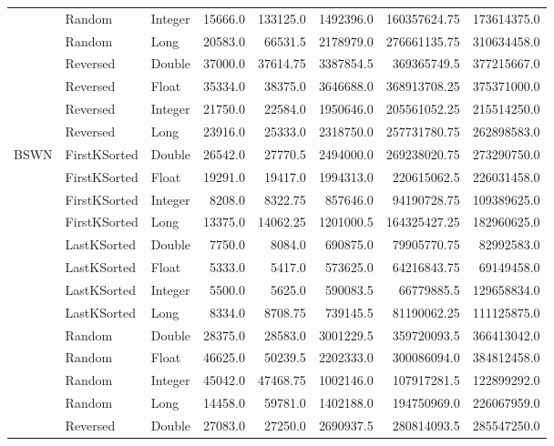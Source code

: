 \documentclass[unicode,11pt,a4paper,oneside,numbers=endperiod,openany]{scrartcl}
\begin{document}
\begin{center}
\begin{longtable}{|l|l|l|r|r|r|r|r|}
            & Random & Integer & 15666.0 & 133125.0 & 1492396.0 & 160357624.75 & 173614375.0 \\
            & Random & Long & 20583.0 & 66531.5 & 2178979.0 & 276661135.75 & 310634458.0 \\
            & Reversed & Double & 37000.0 & 37614.75 & 3387854.5 & 369365749.5 & 377215667.0 \\
            & Reversed & Float & 35334.0 & 38375.0 & 3646688.0 & 368913708.25 & 375371000.0 \\
            & Reversed & Integer & 21750.0 & 22584.0 & 1950646.0 & 205561052.25 & 215514250.0 \\
            & Reversed & Long & 23916.0 & 25333.0 & 2318750.0 & 257731780.75 & 262898583.0 \\
            \hline
            \multirow{16}{*}{BSWN} & FirstKSorted & Double & 26542.0 & 27770.5 & 2494000.0 & 269238020.75 & 273290750.0 \\
            & FirstKSorted & Float & 19291.0 & 19417.0 & 1994313.0 & 220615062.5 & 226031458.0 \\
            & FirstKSorted & Integer & 8208.0 & 8322.75 & 857646.0 & 94190728.75 & 109389625.0 \\
            & FirstKSorted & Long & 13375.0 & 14062.25 & 1201000.5 & 164325427.25 & 182960625.0 \\
            & LastKSorted & Double & 7750.0 & 8084.0 & 690875.0 & 79905770.75 & 82992583.0 \\
            & LastKSorted & Float & 5333.0 & 5417.0 & 573625.0 & 64216843.75 & 69149458.0 \\
            & LastKSorted & Integer & 5500.0 & 5625.0 & 590083.5 & 66779885.5 & 129658834.0 \\
            & LastKSorted & Long & 8334.0 & 8708.75 & 739145.5 & 81190062.25 & 111125875.0 \\
            & Random & Double & 28375.0 & 28583.0 & 3001229.5 & 359720093.5 & 366413042.0 \\
            & Random & Float & 46625.0 & 50239.5 & 2202333.0 & 300086094.0 & 384812458.0 \\
            & Random & Integer & 45042.0 & 47468.75 & 1002146.0 & 107917281.5 & 122899292.0 \\
            & Random & Long & 14458.0 & 59781.0 & 1402188.0 & 194750969.0 & 226067959.0 \\
            & Reversed & Double & 27083.0 & 27250.0 & 2690937.5 & 280814093.5 & 285547250.0 \\

\end{longtable}
\end{center}
\end{document}
